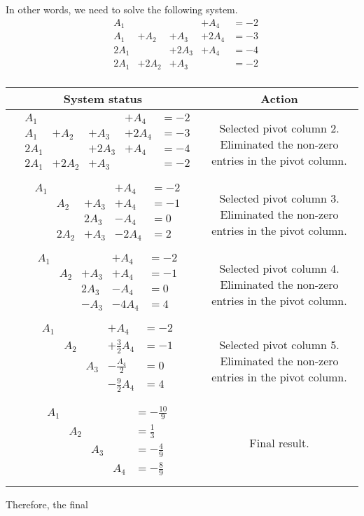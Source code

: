 {\[\]
In other words, we need to solve the following system. \[\begin{array}{llllll} & A_{1} & & & +A_{4} & =-2\\ & A_{1} & +A_{2} & +A_{3} & +2A_{4} & =-3\\ & 2A_{1} & & +2A_{3} & +A_{4} & =-4\\ & 2A_{1} & +2A_{2} & +A_{3} & & =-2\\\end{array}\] \begin{longtable}{cc} System status&Action \\\hline $\begin{array}{llllll} & A_{1} & & & +A_{4} & =-2\\ & A_{1} & +A_{2} & +A_{3} & +2A_{4} & =-3\\ & 2A_{1} & & +2A_{3} & +A_{4} & =-4\\ & 2A_{1} & +2A_{2} & +A_{3} & & =-2\\\end{array}$& Selected pivot column 2. Eliminated the non-zero entries in the pivot column. \\\hline $\begin{array}{llllll} & A_{1} & & & +A_{4} & =-2\\ & & A_{2} & +A_{3} & +A_{4} & =-1\\ & & & 2A_{3} & -A_{4} & =0\\ & & 2A_{2} & +A_{3} & -2A_{4} & =2\\\end{array}$& Selected pivot column 3. Eliminated the non-zero entries in the pivot column. \\\hline $\begin{array}{llllll} & A_{1} & & & +A_{4} & =-2\\ & & A_{2} & +A_{3} & +A_{4} & =-1\\ & & & 2A_{3} & -A_{4} & =0\\ & & & -A_{3} & -4A_{4} & =4\\\end{array}$& Selected pivot column 4. Eliminated the non-zero entries in the pivot column. \\\hline $\begin{array}{llllll} & A_{1} & & & +A_{4} & =-2\\ & & A_{2} & & +\frac{3}{2}A_{4} & =-1\\ & & & A_{3} & -\frac{A_{4} }{2} & =0\\ & & & & -\frac{9}{2}A_{4} & =4\\\end{array}$& Selected pivot column 5. Eliminated the non-zero entries in the pivot column. \\\hline $\begin{array}{llllll} & A_{1} & & & & =-\frac{10}{9}\\ & & A_{2} & & & =\frac{1}{3}\\ & & & A_{3} & & =-\frac{4}{9}\\ & & & & A_{4} & =-\frac{8}{9}\\\end{array}$& Final result.\\ \end{longtable}Therefore, the final }
